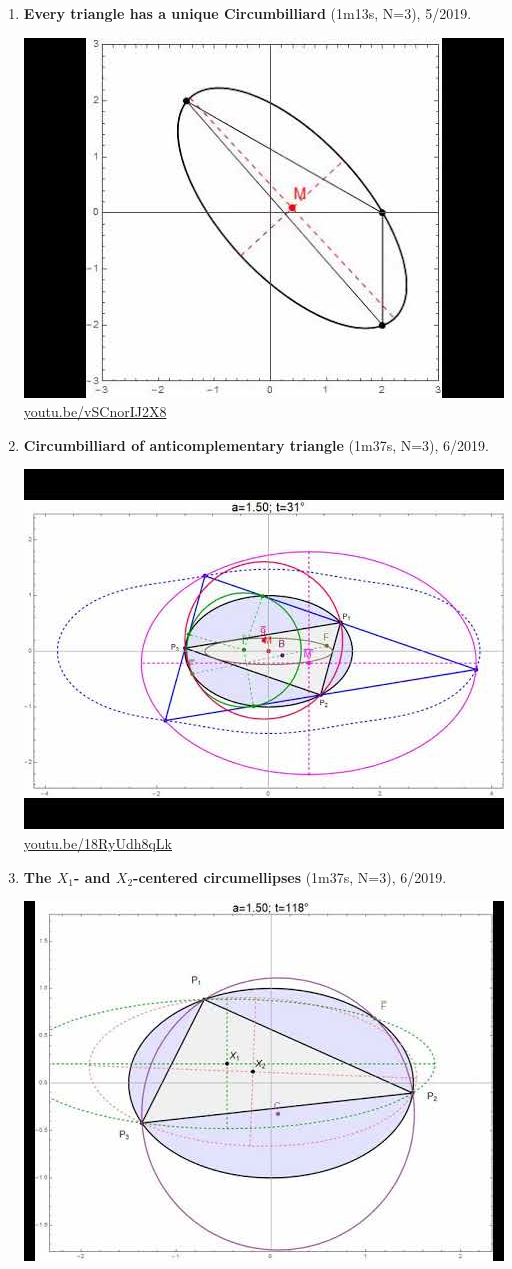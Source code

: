 \documentclass[12pt]{amsart}
\begin{document}
\begin{enumerate}[resume]
\item \textbf{Every triangle has a unique Circumbilliard} (1m13s, N=3), 5/2019. 
\begin{center}\includegraphics[width=.5\textwidth]{pics/vSCnorIJ2X8.jpg} \\ 
\href{https://youtu.be/vSCnorIJ2X8}{\url{youtu.be/vSCnorIJ2X8}}\end{center}
% 
\item \textbf{Circumbilliard of anticomplementary triangle} (1m37s, N=3), 6/2019. 
\begin{center}\includegraphics[width=.5\textwidth]{pics/18RyUdh8qLk.jpg} \\ 
\href{https://youtu.be/18RyUdh8qLk}{\url{youtu.be/18RyUdh8qLk}}\end{center}
% 
\item \textbf{The $X_{1}$- and $X_{2}$-centered circumellipses} (1m37s, N=3), 6/2019. 
\begin{center}\includegraphics[width=.5\textwidth]{pics/AQ2AITmMs-g.jpg} \\ 

\end{center}
\end{enumerate}
\end{document}
